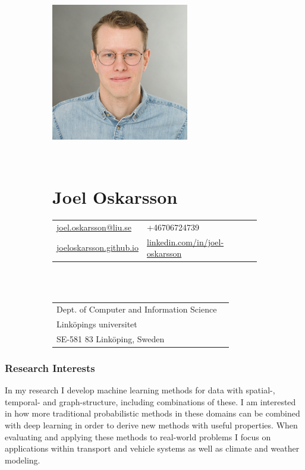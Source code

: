 \documentclass[12pt]{article}
\makeatletter
\newcommand{\email}{joel.oskarsson@liu.se}
\makeatother
\begin{document}
\begin{figure}
    \begin{subfigure}[]{0.4\textwidth}
        \includegraphics[height=6cm]{photo}
    \end{subfigure}%
    ~
    \begin{subfigure}[]{0.5\textwidth}
        \part*{Joel Oskarsson}

        \begin{tabular}{l l}
            \href{mailto:\email}{\email} & +46706724739\\
            \href{http://joeloskarsson.github.io}{joeloskarsson.github.io} & \href{http://linkedin.com/in/joel-oskarsson}{linkedin.com/in/joel-oskarsson}\\
        \end{tabular}
        \\
        \\

        \begin{tabular}{l l}
            Dept. of Computer and Information Science & \\
            Linköpings universitet & \\
            SE-581 83 Linköping, Sweden & \\
        \end{tabular}

     \end{subfigure}%
\end{figure}

\section*{Research Interests}
In my research I develop machine learning methods for data with spatial-, temporal- and graph-structure, including combinations of these.
I am interested in how more traditional probabilistic methods in these domains can be combined with deep learning in order to derive new methods with useful properties.
When evaluating and applying these methods to real-world problems I focus on applications within transport and vehicle systems as well as climate and weather modeling.
\end{document}
